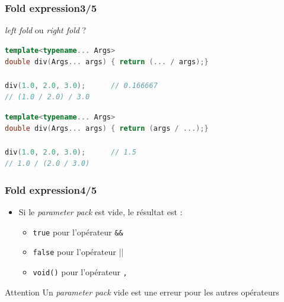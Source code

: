 \documentclass[C++.tex]{subfiles}
\begin{document}
\begin{frame}[fragile]
	\frametitle{Fold expression\titlehfill{}3/5}
	
	\begin{alertblock}{\textit{left fold} ou \textit{right fold} ?}
	
	\begin{lstlisting}[language=C++]
template<typename... Args>
double div(Args... args) { return (... / args);}

div(1.0, 2.0, 3.0);      // 0.166667
// (1.0 / 2.0) / 3.0\end{lstlisting}

	\begin{lstlisting}[language=C++]
template<typename... Args>
double div(Args... args) { return (args / ...);}

div(1.0, 2.0, 3.0);      // 1.5
// 1.0 / (2.0 / 3.0)\end{lstlisting}
	\end{alertblock}
\end{frame}

\begin{frame}[fragile]
	\frametitle{Fold expression\titlehfill{}4/5}
	\begin{itemize}
		\item Si le \textit{parameter pack} est vide, le résultat est :
		\begin{itemize}
			\item \lstinline|true| pour l'opérateur \lstinline|&&|
			\item \lstinline|false| pour l'opérateur \lstinline||||
			\item \lstinline|void()| pour l'opérateur \lstinline|,|
		\end{itemize}
	\end{itemize}

	\begin{alertblock}{Attention}
		Un \textit{parameter pack} vide est une erreur pour les autres opérateurs
	\end{alertblock}
\end{frame}
\end{document}
